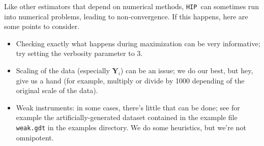 \documentclass[a4paper,10pt]{article}
\newcommand{\app}[1]{\textsf{#1}}
\newcommand{\HIP}{\texttt{HIP}}
\newcommand{\Endog}{\mathbf{Y}_{i}}
\begin{document}
Like other estimators that depend on numerical methods, \HIP\ can
sometimes run into numerical problems, leading to non-convergence. 
If this happens, here are some points to consider.

\begin{itemize}
\item Checking exactly what happens during maximization can be very
  informative; try setting the verbosity parameter to 3.
\item Scaling of the data (especially $\Endog$) can be an issue; we do
  our best, but hey, give us a hand (for example, multiply or divide
  by 1000 depending of the original scale of the data).
\item Weak instruments: in some cases, there's little that can be done;
  see for example the artificially-generated dataset contained in the
%
%
  example file \texttt{weak.gdt} in the examples directory. We do some
  heuristics, but we're not omnipotent.
\end{itemize}



\clearpage
\appendix




\end{document}
